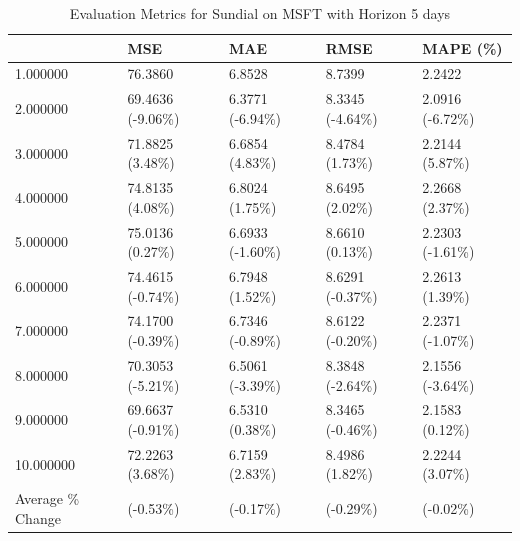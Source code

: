 \begin{table}
\caption{Evaluation Metrics for Sundial on MSFT with Horizon 5 days}
\label{tab:sundial_MSFT_h5_metrics}
\begin{tabular}{lllll}
\toprule
 & MSE & MAE & RMSE & MAPE (\%) \\
\midrule
1.000000 & 76.3860 & 6.8528 & 8.7399 & 2.2422 \\
2.000000 & 69.4636 (-9.06\%) & 6.3771 (-6.94\%) & 8.3345 (-4.64\%) & 2.0916 (-6.72\%) \\
3.000000 & 71.8825 (3.48\%) & 6.6854 (4.83\%) & 8.4784 (1.73\%) & 2.2144 (5.87\%) \\
4.000000 & 74.8135 (4.08\%) & 6.8024 (1.75\%) & 8.6495 (2.02\%) & 2.2668 (2.37\%) \\
5.000000 & 75.0136 (0.27\%) & 6.6933 (-1.60\%) & 8.6610 (0.13\%) & 2.2303 (-1.61\%) \\
6.000000 & 74.4615 (-0.74\%) & 6.7948 (1.52\%) & 8.6291 (-0.37\%) & 2.2613 (1.39\%) \\
7.000000 & 74.1700 (-0.39\%) & 6.7346 (-0.89\%) & 8.6122 (-0.20\%) & 2.2371 (-1.07\%) \\
8.000000 & 70.3053 (-5.21\%) & 6.5061 (-3.39\%) & 8.3848 (-2.64\%) & 2.1556 (-3.64\%) \\
9.000000 & 69.6637 (-0.91\%) & 6.5310 (0.38\%) & 8.3465 (-0.46\%) & 2.1583 (0.12\%) \\
10.000000 & 72.2263 (3.68\%) & 6.7159 (2.83\%) & 8.4986 (1.82\%) & 2.2244 (3.07\%) \\
Average \% Change & (-0.53\%) & (-0.17\%) & (-0.29\%) & (-0.02\%) \\
\bottomrule
\end{tabular}
\end{table}
